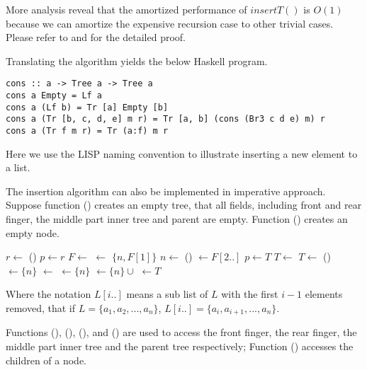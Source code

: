 \documentclass[UTF8]{article}
\begin{document}
More analysis reveal that the amortized performance of $insertT()$ is $O(1)$
because we can amortize the expensive recursion case to other trivial cases.
Please refer to \cite{okasaki-book} and \cite{finger-tree-2006} for the detailed proof.

Translating the algorithm yields the below Haskell program.

\begin{lstlisting}
cons :: a -> Tree a -> Tree a
cons a Empty = Lf a
cons a (Lf b) = Tr [a] Empty [b]
cons a (Tr [b, c, d, e] m r) = Tr [a, b] (cons (Br3 c d e) m) r
cons a (Tr f m r) = Tr (a:f) m r
\end{lstlisting}

Here we use the LISP naming convention to illustrate inserting a
new element to a list.

The insertion algorithm can also be implemented in imperative approach. Suppose
function () creates an empty tree, that all fields, including
front and rear finger, the middle part inner tree and parent are empty.
Function () creates an empty node.

\begin{algorithmic}
  \State $r \gets $ ()
  \State $p \gets r$
  \State {}
    \State $F \gets $   
    \State {} $\gets$ $\{n, F[1]\}$  
    \State $n \gets$ ()
    \State {} $\gets F[2..]$  
    \State $p \gets T$
    \State $T \gets$ 
  \EndWhile
    \State $T \gets$ ()
    \State {}$\gets \{ n \}$
    \State {} $\gets$ 
    \State {} $\gets \{ n \}$
  \Else
    \State {} $\gets \{ n \} \cup $ 
  \EndIf
  \State {} $\gets T$
  \State \Return {}
\EndFunction
\end{algorithmic}

Where the notation $L[i..]$ means a sub list of $L$ with the first $i-1$
elements removed, that if $L = \{a_1, a_2, ..., a_n\}$, $L[i..] = \{a_i, a_{i+1}, ..., a_n\}$.

Functions (), (), (), and ()
are used to access the front finger, the rear finger, the middle part inner tree and
the parent tree respectively; Function () accesses the children of a
node.
\end{document}
